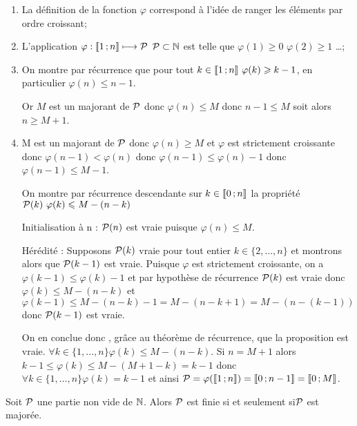 \begin{enumerate}
\item La définition de la fonction $\varphi$ correspond à l'idée de ranger les éléments par ordre croissant;
\item L'application $\varphi:\intervalleentier{1}{n} \longmapsto \P$ $\P \subset \N$ est telle que $\varphi(1)\geqslant 0$ $\varphi(2)\geqslant 1$ \ldots;
\item On montre par récurrence que pour tout $k\in\intervalleentier{1}{n} \ 
\varphi(k)\geqslant k-1$, en particulier $\varphi(n)\leqslant n-1$. 

Or $M$ est un majorant de $\P$ donc $\varphi(n)\leqslant M$ donc $n-1\leqslant M$ soit alors $n\geqslant M+1$.
\item M est un majorant de $\P$ donc $\varphi(n)\geqslant M$ et $\varphi$ est strictement croissante donc $\varphi(n-1)<\varphi(n)$ donc $\varphi(n-1)\leqslant\varphi(n)-1$ donc $\varphi(n-1)\leqslant M-1$. 

On montre par récurrence descendante sur $k\in\intervalleentier{0}{n}$ la propriété $\P(k) \ \varphi(k)\leqslant M-(n-k)$

Initialisation à n : $\P(n)$ est vraie puisque $\varphi(n)\leqslant M$.

Hérédité : Supposons $\P(k)$ vraie pour tout entier $k\in\{2, \ldots,n\}$ et montrons alors que $\P(k-1)$ est vraie. Puisque $\varphi$ est strictement croissante, on a $\varphi(k-1)\leqslant \varphi(k)-1$ et par hypothèse de récurrence $\P(k)$ est vraie donc $\varphi(k)\leqslant M-(n-k)$ et $\varphi(k-1)\leqslant M-(n-k)-1=M-(n-k+1)=M-(n-(k-1))$ donc $\P(k-1)$ est vraie. 

On en conclue donc , grâce au théorème de récurrence, que la proposition est vraie. $\forall k \in \{1, \ldots, n\} \varphi(k)\leqslant M-(n-k)$. Si $n=M+1$ alors 
$k-1\leqslant \varphi(k)\leqslant M - (M+1-k)=k-1$ donc $\forall k \in \{1, \ldots,n\} \varphi(k)=k-1$ et ainsi $\P=\varphi(\intervalleentier{1}{n})=\intervalleentier{0}{n-1}= \intervalleentier{0}{M}$.
\end{enumerate}
\begin{prop}
  Soit $\P$ une partie non vide de $\N$. Alors $\P$ est finie si et seulement si$\P$ est majorée.
\end{prop}
